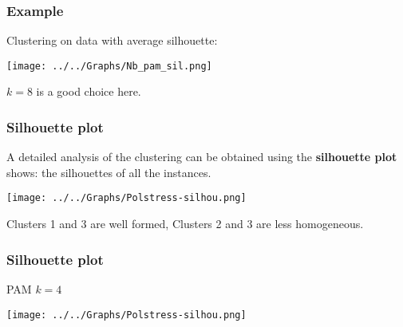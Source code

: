 \begin{frame}
\frametitle{Example}
Clustering on data with average silhouette:
\begin{center}
\texttt{[image: ../../Graphs/Nb\_pam\_sil.png]}
\end{center}
$k=8$ is a good choice here.
\end{frame}
\begin{frame}
\frametitle{Silhouette plot}
A detailed analysis of the clustering can be obtained using the {\bf silhouette plot} shows: the silhouettes of all the instances.
\begin{center}
\texttt{[image: ../../Graphs/Polstress-silhou.png]}
\end{center}
Clusters 1 and 3 are well formed, Clusters 2 and 3 are less homogeneous. 
\end{frame}
\begin{frame}
\frametitle{Silhouette plot}
PAM $k=4$ 
\begin{center}
\texttt{[image: ../../Graphs/Polstress-silhou.png]}
\end{center}
\end{frame}
